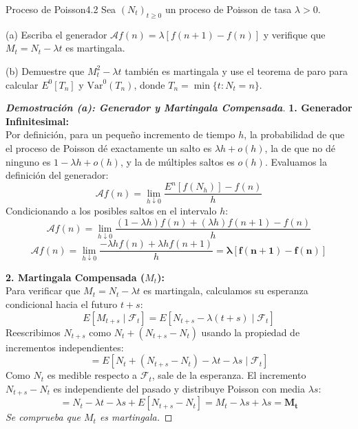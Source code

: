 \documentclass[10pt,a4paper]{article}
\begin{document}
\vspace{5mm}

\begin{ejercicio}{Proceso de Poisson}{4.2}
    Sea $(N_t)_{t \ge 0}$ un proceso de Poisson de tasa $\lambda > 0$.
    
    (a) Escriba el generador $\mathcal{A}f(n) = \lambda[f(n+1)-f(n)]$ y verifique que $M_t = N_t - \lambda t$ es martingala.
    
    (b) Demuestre que $M_t^2 - \lambda t$ también es martingala y use el teorema de paro para calcular $E^0[T_n]$ y $\text{Var}^0(T_n)$, donde $T_n = \min\{t: N_t = n\}$.
\end{ejercicio}

\vspace{2mm}

\begin{proof}[\textbf{Demostración (a): Generador y Martingala Compensada}]
    \textbf{1. Generador Infinitesimal:} \\
    Por definición, para un pequeño incremento de tiempo $h$, la probabilidad de que el proceso de Poisson dé exactamente un salto es $\lambda h + o(h)$, la de que no dé ninguno es $1 - \lambda h + o(h)$, y la de múltiples saltos es $o(h)$. Evaluamos la definición del generador:
    $$ \mathcal{A}f(n) = \lim_{h \downarrow 0} \frac{E^n[f(N_h)] - f(n)}{h} $$
    Condicionando a los posibles saltos en el intervalo $h$:
    $$ \mathcal{A}f(n) = \lim_{h \downarrow 0} \frac{(1 - \lambda h)f(n) + (\lambda h)f(n+1) - f(n)}{h} $$
    $$ \mathcal{A}f(n) = \lim_{h \downarrow 0} \frac{-\lambda h f(n) + \lambda h f(n+1)}{h} = \mathbf{\lambda [f(n+1) - f(n)]} $$
    
    \vspace{3mm}
    \textbf{2. Martingala Compensada ($M_t$):} \\
    Para verificar que $M_t = N_t - \lambda t$ es martingala, calculamos su esperanza condicional hacia el futuro $t+s$:
    $$ E[M_{t+s} \mid \mathcal{F}_t] = E[N_{t+s} - \lambda(t+s) \mid \mathcal{F}_t] $$
    Reescribimos $N_{t+s}$ como $N_t + (N_{t+s} - N_t)$ usando la propiedad de incrementos independientes:
    $$ = E[N_t + (N_{t+s} - N_t) - \lambda t - \lambda s \mid \mathcal{F}_t] $$
    Como $N_t$ es medible respecto a $\mathcal{F}_t$, sale de la esperanza. El incremento $N_{t+s} - N_t$ es independiente del pasado y distribuye Poisson con media $\lambda s$:
    $$ = N_t - \lambda t - \lambda s + E[N_{t+s} - N_t] = M_t - \lambda s + \lambda s = \mathbf{M_t} $$
    \textit{Se comprueba que $M_t$ es martingala.}
\end{proof}
\end{document}
